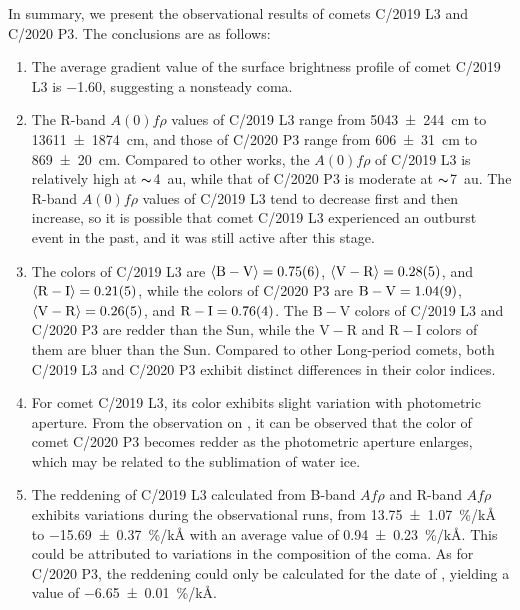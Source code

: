 In summary, we present the observational results of comets C/2019 L3 and C/2020 P3. The conclusions are as follows: 
\begin{enumerate}
    \item The average gradient value of the surface brightness profile of comet C/2019 L3 is \num{-1.60}, suggesting a nonsteady coma. 
    \item The R-band $A(0)f\rho$ values of C/2019 L3 range from {\qty{5043 +- 244}{\cm}} to {\qty{13611 +- 1874}{\cm}}, and those of C/2020 P3 range from {\qty{606 +- 31}{\cm}} to {\qty{869 +- 20}{\cm}}. Compared to other works, the $A(0)f\rho$ of C/2019 L3 is relatively high at $\thicksim${\qty{4}{\astronomicalunit}}, while that of C/2020 P3 is moderate at $\thicksim${\qty{7}{\astronomicalunit}}. The R-band $A(0)f\rho$ values of C/2019 L3 tend to decrease first and then increase, so it is possible that comet C/2019 L3 experienced an outburst event in the past, and it was still active after this stage. 
    \item The colors of C/2019 L3 are  
        $\langle \mathrm{B-V} \rangle = \num{0.75 +- 0.06}$, 
        $\langle \mathrm{V-R} \rangle = \num{0.28 +- 0.05}$, and 
        $\langle \mathrm{R-I} \rangle = \num{0.21 +- 0.05}$,  
        while the colors of C/2020 P3 are 
        $\mathrm{B-V} = \num{1.04 +- 0.09}$, 
        $\langle \mathrm{V-R} \rangle = \num{0.26 +- 0.05}$, and 
        $\mathrm{R-I} = \num{0.76 +- 0.04}$. 
        The $\mathrm{B-V}$ colors of C/2019 L3 and C/2020 P3 are redder than the Sun, while the $\mathrm{V-R}$ and $\mathrm{R-I}$ colors of them are bluer than the Sun. Compared to other Long-period comets, both C/2019 L3 and C/2020 P3 exhibit distinct differences in their color indices. 
    \item For comet C/2019 L3, its color exhibits slight variation with photometric aperture. From the observation on , it can be observed that the color of comet C/2020 P3 becomes redder as the photometric aperture enlarges, which may be related to the sublimation of water ice. 
    \item The reddening of C/2019 L3 calculated from B-band $Af\rho$ and R-band $Af\rho$ exhibits variations during the observational runs, from {\qty{13.75 +- 1.07}{\percent/\kilo\angstrom}} to {\qty{-15.69 +- 0.37}{\percent/\kilo\angstrom}} with an average value of {\qty{0.94 +- 0.23}{\percent/\kilo\angstrom}}. This could be attributed to  variations in the composition of the coma. As for C/2020 P3, the reddening could only be calculated for the date of , yielding a value of {\qty{-6.65 +- 0.01}{\percent/\kilo\angstrom}}. 
\end{enumerate}

